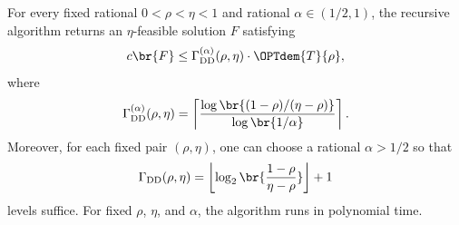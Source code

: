 \begin{theorem}\label{thm:tree-degree-config-recursive}
    For every fixed rational $0<\rho<\eta<1$ and rational $\alpha\in(1/2,1)$, the recursive algorithm returns an $\eta$-feasible solution $F$ satisfying
    \[
        c\br{F}\leq\Gamma_{\mathrm{DD}}^{(\alpha)}(\rho,\eta)\cdot\OPTdem{T}{\rho},
    \]
    where
    \begin{equation}\label{eq:tree-recursion-depth}
        \Gamma_{\mathrm{DD}}^{(\alpha)}(\rho,\eta)
        =\left\lceil
            \frac{
                \log\br{(1-\rho)/(\eta-\rho)}
            }{
                \log\br{1/\alpha}
            }
        \right\rceil.
    \end{equation}
    Moreover, for each fixed pair $(\rho,\eta)$, one can choose a rational $\alpha>1/2$ so that
    \begin{equation}\label{eq:tree-recursion-best-depth}
        \Gamma_{\mathrm{DD}}(\rho,\eta)
        =\left\lfloor
            \log_2\br{\frac{1-\rho}{\eta-\rho}}
          \right\rfloor+1
    \end{equation}
    levels suffice. For fixed $\rho$, $\eta$, and $\alpha$, the algorithm runs in polynomial time.
\end{theorem}
